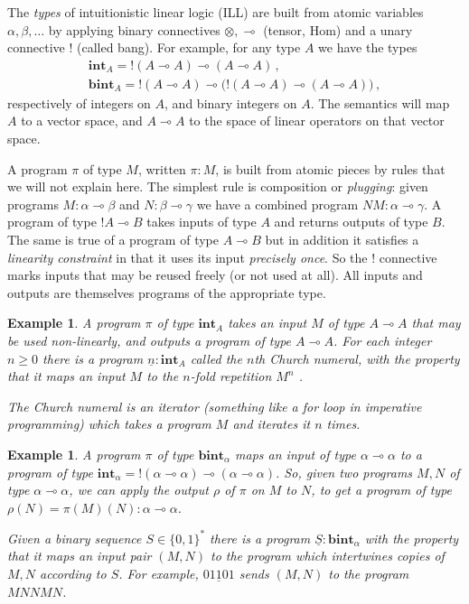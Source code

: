 \documentclass[english,letter paper,12pt,leqno]{article}
\theoremstyle{example}
\newtheorem{example}[theorem]{Example}
\numberwithin{equation}{section}
\begin{document}
The \emph{types} of intuitionistic linear logic (ILL) are built from atomic variables $\alpha, \beta, \ldots$ by applying binary connectives $\otimes, \multimap$ (tensor, Hom) and a unary connective ${!}$ (called bang). For example, for any type $A$ we have the types
\begin{gather*}
\textbf{int}_A = {!}(A \multimap A) \multimap (A \multimap A)\,,\\
\textbf{bint}_A = {!}(A \multimap A) \multimap \big({!}(A \multimap A) \multimap (A \multimap A)\big)\,,
\end{gather*}
respectively of integers on $A$, and binary integers on $A$. The semantics will map $A$ to a vector space, and $A \multimap A$ to the space of linear operators on that vector space.

A program $\pi$ of type $M$, written $\pi : M$, is built from atomic pieces by rules that we will not explain here. The simplest rule is composition or \emph{plugging}: given programs $M : \alpha \multimap \beta$ and $N: \beta \multimap \gamma$ we have a combined program $N M: \alpha \multimap \gamma$. A program of type ${!} A \multimap B$ takes inputs of type $A$ and returns outputs of type $B$. The same is true of a program of type $A \multimap B$ but in addition it satisfies a \emph{linearity constraint} in that it uses its input \emph{precisely once}. So the ${!}$ connective marks inputs that may be reused freely (or not used at all). All inputs and outputs are themselves programs of the appropriate type.

\begin{example} A program $\pi$ of type $\textbf{int}_A$ takes an input $M$ of type $A \multimap A$ that may be used non-linearly, and outputs a program of type $A \multimap A$. For each integer $n \ge 0$ there is a program $\underline{n} : \textbf{int}_A$ called the $n$th \emph{Church numeral}, with the property that it maps an input $M$ to the $n$-fold repetition $M^n$ \cite{??}.

The Church numeral is an \emph{iterator} (something like a \emph{for} loop in imperative programming) which takes a program $M$ and iterates it $n$ times.
\end{example}

\begin{example} A program $\pi$ of type $\textbf{bint}_\alpha$ maps an input of type $\alpha \multimap \alpha$ to a program of type $\textbf{int}_\alpha = {!}(\alpha \multimap \alpha) \multimap (\alpha \multimap \alpha)$. So, given two programs $M,N$ of type $\alpha \multimap \alpha$, we can apply the output $\rho$ of $\pi$ on $M$ to $N$, to get a program of type $\rho( N ) = \pi(M)(N) : \alpha \multimap \alpha$. 

Given a binary sequence $S \in \{0,1\}^*$ there is a program $\underline{S} : \textbf{bint}_\alpha$ with the property that it maps an input pair $(M,N)$ to the program which intertwines copies of $M,N$ according to $S$. For example, $\underline{01101}$ sends $(M,N)$ to the program $M N N M N$.
\end{example}
\end{document}
